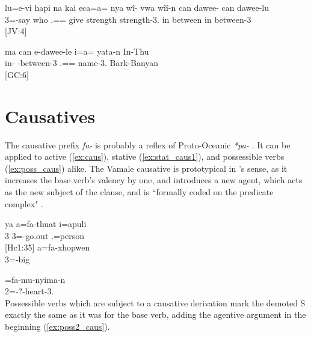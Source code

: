 \ea\label{ex:can_daweelu}
\gll lu=e-vi hapi na kai eca=a= nya wî- vwa wîî-n can dawee- can dawee-lu\\ 
 3=-say   who .== give strength  strength-3. in between in between-3\\ 
\glt {} {[JV:4]}
\z


\ea\label{ex:can_e}
\gll ma can e-dawee-le i=a= yata-n In-Thu\\ 
  in- -between-3 .== name-3. Bark-Banyan\\ 
\glt {} {[GC:6]}
\z

 \section{Causatives}
 \label{sec:caus}
 
The causative prefix \textit{fa-} is probably a reflex of Proto-Oceanic \textit{*pa-}  \parencite[510]{ross_morphosyntactic_2004}. It can be applied to active (\ref{ex:caus}), stative (\ref{ex:stat_caus1}), and possessible verbs (\ref{ex:poss_caus}) alike. The Vamale causative is prototypical in \citeauthor{zuniga_grammatical_2019}'s sense, as it increases the base verb's valency by one, and introduces a new agent, which acts as the new subject of the clause, and is ``formally coded on the predicate complex" \parencite[15--16]{zuniga_grammatical_2019}.

\ea\label{ex:caus}
\gll ya a=fa-thuat {i}={apuli}\\ 
 3 3=-go.out .=person \\ 
\glt {} {[Hc1:35]}
\z
\ea 
\label{ex:stat_caus1}
\gll a=fa-xhopwen\\ 
 3=-big\\ 
\glt {}
\z 
\ea \label{ex:poss_caus}
	
		=fa-mu-nyima-n\\ 
	 2=-?-heart-3.\\ 
	\glt {}
	\z
%
%
%
Possessible verbs which are subject to a causative derivation mark the demoted S exactly the same as it was for the base verb, adding the agentive argument in the beginning (\ref{ex:poss2_caus}). 


